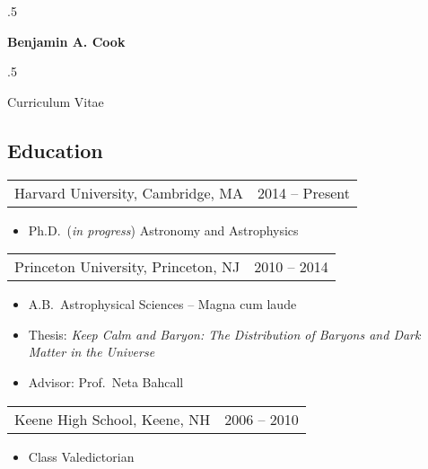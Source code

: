\documentclass{res}
\newcommand\mancenter[1]{\moveleft.5\hoffset\centerline{#1}}
\begin{document}
  
\mancenter{\huge \bf{Benjamin A. Cook}}
\mancenter{\huge Curriculum Vitae} 

\address{Mailing Address:\\60 Garden St. Mail Stop 10\\Cambridge, MA
  02138\\Email:
  \href{mailto:bcook@g.harvard.edu}{bcook@g.harvard.edu}}
\address{Phone: (603) 313-2888\\Homepage:
  \href{http://astro.princeton.edu/~bacook}{http://astro.princeton.edu/$\sim$bacook}\\Blog:
  \href{http://violentrelaxation.wordpress.com}{http://violentrelaxation.wordpress.com}\\Twitter:
  \href{https://twitter.com/bacook17}{@bacook17}}

\begin{resume}                        

\section{\textbf{Education}}
\vspace{.05in}
\begin{tabular}{@{}p{4in} r@{}}
Harvard University, Cambridge, MA & 2014 -- Present
\end{tabular}
\begin{itemize} \itemsep -2pt
\item[] Ph.D.~(\textit{in progress}) Astronomy and Astrophysics
\end{itemize}

\begin{tabular}{@{}p{4in} r@{}}
  Princeton University, Princeton, NJ & 2010 -- 2014
\end{tabular}
\begin{itemize} \itemsep -2pt
\item[] A.B.~Astrophysical Sciences -- Magna cum laude
\item[] Thesis: \textit{Keep Calm and Baryon: The Distribution of
  Baryons and Dark Matter in the Universe}
\item[] Advisor: Prof.~Neta Bahcall
\end{itemize}

\begin{tabular}{@{}p{4in} r@{}}
  Keene High School, Keene, NH & 2006 -- 2010
\end{tabular}
\begin{itemize} \itemsep -2pt
\item[] Class Valedictorian
\end{itemize}


\end{resume}
\end{document}
